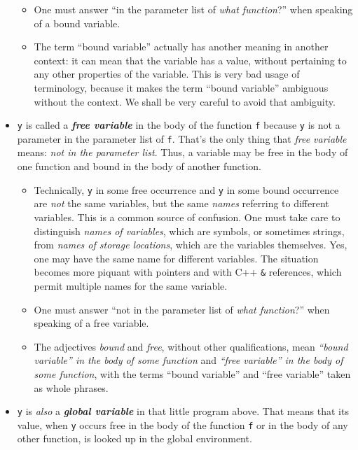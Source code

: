 \documentclass[10pt,oneside,x11names]{article}
\begin{document}
\begin{itemize}
\begin{itemize}
\item One must answer ``in the parameter list of \emph{what function}?''
when speaking of a bound variable.

\item The term ``bound variable'' actually has another meaning in
another context: it can mean that the variable has a value,
without pertaining to any other properties of the variable.
This is very bad usage of terminology, because it makes the
term ``bound variable'' ambiguous without the context. We shall
be very careful to avoid that ambiguity.
\end{itemize}

\item \texttt{y} is called a \textbf{\emph{free variable}} in the body of the function
\texttt{f} because \texttt{y} is not a parameter in the parameter list of \texttt{f}.
That's the only thing that \emph{free variable} means: \emph{not in the
parameter list}. Thus, a variable may be free in the body of one
function and bound in the body of another function.

\begin{itemize}
\item Technically, \texttt{y} in some free occurrence and \texttt{y} in some bound
occurrence are \emph{not} the same variables, but the same \emph{names}
referring to different variables. This is a common source of
confusion. One must take care to distinguish \emph{names of
variables}, which are symbols, or sometimes strings, from
\emph{names of storage locations}, which are the variables
themselves. Yes, one may have the same name for different
variables. The situation becomes more piquant with pointers
and with C++ \texttt{\&} references, which permit multiple names for
the same variable.

\item One must answer ``not in the parameter list of \emph{what
function}?'' when speaking of a free variable.

\item The adjectives \emph{bound} and \emph{free}, without other
qualifications, mean \emph{``bound variable'' in the body of some
function} and \emph{``free variable'' in the body of some function},
with the terms ``bound variable'' and ``free variable'' taken as
whole phrases.
\end{itemize}

\item \texttt{y} is \emph{also} a \textbf{\emph{global variable}} in that little program
above. That means that its value, when \texttt{y} occurs free in the
body of the function \texttt{f} or in the body of any other function,
is looked up in the global environment.


\end{itemize}
\end{document}
